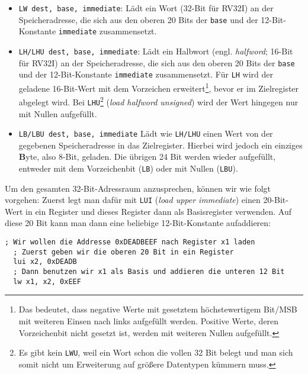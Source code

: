 \begin{itemize}
  \item \lstinline[style=risc-v_Assembler]!LW dest, base, immediate!: Lädt ein Wort (32-Bit für RV32I) an der
    Speicheradresse, die sich aus den oberen 20 Bits der \lstinline[style=risc-v_Assembler]!base! und der
    12-Bit-Konstante \lstinline[style=risc-v_Assembler]!immediate! zusammensetzt.
  \item\lstinline[style=risc-v_Assembler]!LH/LHU dest, base, immediate!: Lädt ein Halbwort
    (engl. \emph{halfword}; 16-Bit für RV32I) an der Speicheradresse, die sich
    aus den oberen 20 Bits der \lstinline[style=risc-v_Assembler]!base! und der 12-Bit-Konstante
    \lstinline[style=risc-v_Assembler]!immediate! zusammensetzt. Für \lstinline[style=risc-v_Assembler]!LH! wird der geladene 16-Bit-Wert
    mit dem Vorzeichen erweitert\footnote{Das bedeutet, dass negative Werte mit gesetztem höchstewertigem Bit/MSB
      mit weiteren Einsen nach links aufgefüllt werden. Positive Werte, deren
      Vorzeichenbit nicht gesetzt ist, werden mit weiteren Nullen aufgefüllt.}, bevor er im
    Zielregister abgelegt wird. Bei \lstinline[style=risc-v_Assembler]!LHU!\footnote{Es gibt kein \lstinline[style=risc-v_Assembler]!LWU!,
      weil ein Wort schon die vollen 32 Bit belegt und man sich somit nicht um
      Erweiterung auf größere Datentypen kümmern muss.} (\emph{load halfword
      unsigned}) wird der Wert hingegen nur mit Nullen aufgefüllt.
  \item \lstinline[style=risc-v_Assembler]!LB/LBU dest, base, immediate! Lädt wie \lstinline[style=risc-v_Assembler]!LH/LHU! einen Wert von
    der gegebenen Speicheradresse in das Zielregister. Hierbei wird jedoch ein
    einziges \textbf{B}yte, also 8-Bit, geladen. Die übrigen 24 Bit werden wieder
    aufgefüllt, entweder mit dem Vorzeichenbit (\lstinline[style=risc-v_Assembler]!LB!) oder mit Nullen
    (\lstinline[style=risc-v_Assembler]!LBU!).
\end{itemize}

Um den gesamten 32-Bit-Adressraum anzusprechen, können wir wie folgt vorgehen:
Zuerst legt man dafür mit \lstinline[style=risc-v_Assembler]!LUI! (\emph{load upper immediate}) einen 20-Bit-Wert
in ein Register und dieses Register dann als Basisregister
verwenden. Auf diese 20 Bit kann man dann eine beliebige 12-Bit-Konstante
aufaddieren:

\begin{lstlisting}[style=risc-v_Assembler]
  ; Wir wollen die Addresse 0xDEADBEEF nach Register x1 laden
  ; Zuerst geben wir die oberen 20 Bit in ein Register
  lui x2, 0xDEADB
  ; Dann benutzen wir x1 als Basis und addieren die unteren 12 Bit
  lw x1, x2, 0xEEF
\end{lstlisting}

